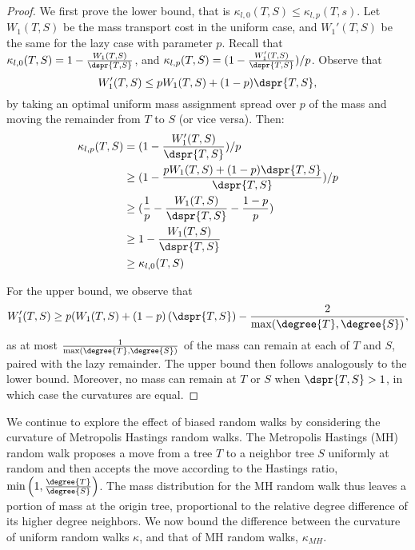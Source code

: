 \documentclass{amsart}
\begin{document}
\begin{proof}
	We first prove the lower bound, that is $\kappa_{l,0}(T,S) \le \kappa_{l,p}(T,s)$.
	Let $W_1(T,S)$ be the mass transport cost in the uniform case, and $W_1'(T,S)$ be the same for the lazy case with parameter $p$.
	Recall that $\kappa_{l,0}(T,S) = 1 - \frac{W_1(T,S)}{\dspr{T,S}}$, and $\kappa_{l,p}(T,S) = (1 - \frac{W_1'(T,S)}{\dspr{T,S}}) / p$.
	Observe that $$W_1'(T,S) \le pW_1(T,S) + (1-p)\dspr{T,S},$$ by taking an optimal uniform mass assignment spread over $p$ of the mass and moving the remainder from $T$ to $S$ (or vice versa).
	Then:
	\begin{align*}
		\kappa_{l,p}(T,S) &= (1 - \frac{W_1'(T,S)}{\dspr{T,S}}) / p \\
		&\ge (1 - \frac{pW_1(T,S) + (1-p)\dspr{T,S}}{\dspr{T,S}}) / p \\
		&\ge (\frac{1}{p} - \frac{W_1(T,S)}{\dspr{T,S}} - \frac{1-p}{p}) \\
		&\ge 1 - \frac{W_1(T,S)}{\dspr{T,S}} \\
		&\ge \kappa_{l,0}(T,S)
	\end{align*}

	For the upper bound, we observe that $$W_1'(T,S) \ge p(W_1(T,S) + (1-p)\left(\dspr{T,S}\right) - \frac{2}{\max(\degree{T}, \degree{S})},$$ as at most $\frac{1}{\max(\degree{T},\degree{S})}$ of the mass can remain at each of $T$ and $S$, paired with the lazy remainder.
	The upper bound then follows analogously to the lower bound.
	Moreover, no mass can remain at $T$ or $S$ when $\dspr{T,S} > 1$, in which case the curvatures are equal.
\end{proof}

We continue to explore the effect of biased random walks by considering the curvature of Metropolis Hastings random walks.
The Metropolis Hastings (MH) random walk proposes a move from a tree $T$ to a neighbor tree $S$ uniformly at random and then accepts the move according to the Hastings ratio, $\min\left(1, \frac{\degree{T}}{\degree{S}}\right)$.
The mass distribution for the MH random walk thus leaves a portion of mass at the origin tree, proportional to the relative degree difference of its higher degree neighbors.
We now bound the difference between the curvature of uniform random walks $\kappa$, and that of MH random walks, $\kappa_{MH}$.
\end{document}
